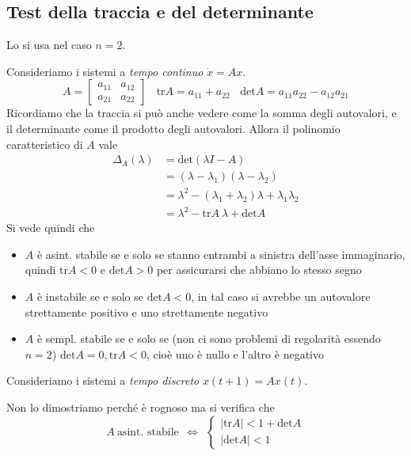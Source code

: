\documentclass[10pt,a4paper]{book}
\begin{document}
\subsection{Test della traccia e del determinante}

Lo si usa nel caso $n=2$.

Consideriamo i sistemi a \textit{tempo continuo} $\dot{x} =Ax$.
\begin{equation*}
A=\begin{bmatrix}
a_{11} & a_{12}\\
a_{21} & a_{22}
\end{bmatrix} \ \ \ \ \mathrm{tr} A=a_{11} +a_{22} \ \ \ \ \mathrm{det} A=a_{11} a_{22} -a_{12} a_{21}
\end{equation*}
Ricordiamo che la traccia si può anche vedere come la somma degli autovalori, e il determinante come il prodotto degli autovalori. Allora il polinomio caratteristico di $A$ vale
\begin{equation*}
\begin{aligned}
\Delta _{A}\left( \lambda \right) & =\mathrm{det}\left( \lambda I-A\right)\\
 & =\left( \lambda -\lambda _{1}\right)\left( \lambda -\lambda _{2}\right)\\
 & =\lambda ^{2} -\left( \lambda _{1} +\lambda _{2}\right) \lambda +\lambda _{1} \lambda _{2}\\
 & =\lambda ^{2} -\mathrm{tr} A\ \lambda +\mathrm{det} A
\end{aligned}
\end{equation*}
Si vede quindi che
\begin{itemize}
\item $A$ è asint. stabile se e solo se stanno entrambi a sinistra dell'asse immaginario, quindi $\mathrm{tr} A< 0$ e $\mathrm{det} A >0$ per assicurarsi che abbiano lo stesso segno
\item $A$ è instabile se e solo se $\mathrm{det} A< 0$, in tal caso si avrebbe un autovalore strettamente positivo e uno strettamente negativo
\item $A$ è sempl. stabile se e solo se (non ci sono problemi di regolarità essendo $n=2$) $\mathrm{det} A=0,\mathrm{tr} A< 0$, cioè uno è nullo e l'altro è negativo
\end{itemize}

Consideriamo i sistemi a \textit{tempo discreto} $x\left( t+1\right) =Ax\left( t\right)$.

Non lo dimostriamo perché è rognoso ma si verifica che
\begin{equation*}
A\ \text{asint. stabile} \ \ \Leftrightarrow \ \ \begin{cases}
\left| \mathrm{tr} A\right| < 1+\mathrm{det} A\\
\left| \mathrm{det} A\right| < 1
\end{cases}
\end{equation*}
\end{document}
